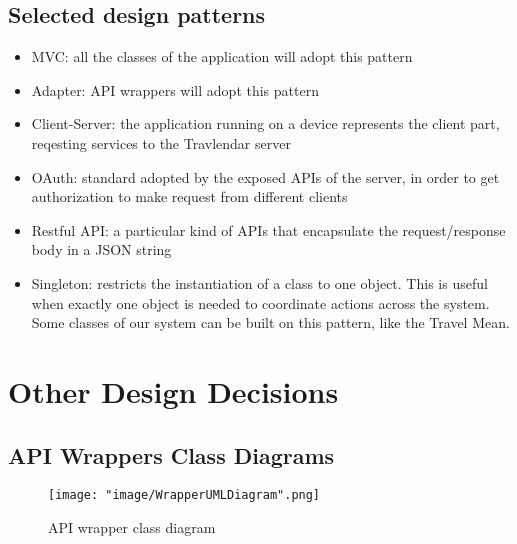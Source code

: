\subsection{Selected design patterns}

\begin{itemize}
\item MVC: all the classes of the application will adopt this pattern
\item Adapter: API wrappers will adopt this pattern
\item Client-Server: the application  running on a device represents the client part, reqesting services to the Travlendar server
\item OAuth: standard adopted by the exposed APIs of the server, in order to get authorization to make request from different clients
\item Restful API: a particular kind of APIs that encapsulate the request/response body in a JSON string
\item Singleton: restricts the instantiation of a class to one object. This is useful when exactly one object is needed to coordinate actions across the system. Some classes of our system can be built on this pattern, like the Travel Mean.
\end{itemize}

\section{Other Design Decisions}

\subsection{API Wrappers Class Diagrams}



\begin{figure}[H]
\begin{center}
\texttt{[image: "image/WrapperUMLDiagram".png]}
\caption{API wrapper class diagram}
\end{center}
\end{figure}